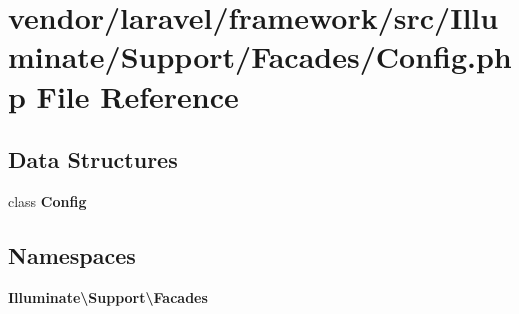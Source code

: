 \section{vendor/laravel/framework/src/\+Illuminate/\+Support/\+Facades/\+Config.php File Reference}
\label{laravel_2framework_2src_2_illuminate_2_support_2_facades_2_config_8php}
\subsection*{Data Structures}
\begin{DoxyCompactItemize}
\item 
class {\bf Config}
\end{DoxyCompactItemize}
\subsection*{Namespaces}
\begin{DoxyCompactItemize}
\item 
 {\bf Illuminate\textbackslash{}\+Support\textbackslash{}\+Facades}
\end{DoxyCompactItemize}
